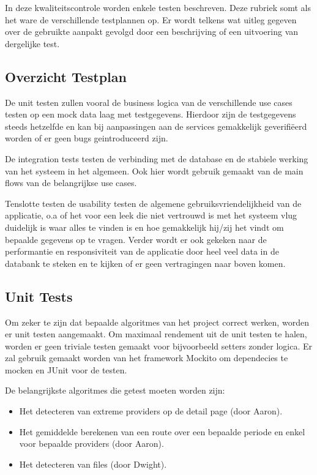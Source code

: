 In deze kwaliteitscontrole worden enkele testen beschreven. Deze rubriek somt als het ware de verschillende testplannen op. Er wordt telkens wat uitleg gegeven over de gebruikte aanpakt gevolgd door een beschrijving of een uitvoering van dergelijke test. 

\subsection{Overzicht Testplan}

De unit testen zullen vooral de business logica van de verschillende use cases testen op een mock data laag met testgegevens. Hierdoor zijn de testgegevens steeds hetzelfde en kan bij aanpassingen aan de services gemakkelijk geverifiëerd worden of er geen bugs geintroduceerd zijn.

De integration tests testen de verbinding met de database en de stabiele werking van het systeem in het algemeen. Ook hier wordt gebruik gemaakt van de main flows van de belangrijkse use cases.

Tenslotte testen de usability testen de algemene gebruiksvriendelijkheid van de applicatie, o.a of het voor een leek die niet vertrouwd is met het systeem vlug duidelijk is waar alles te vinden is en hoe gemakkelijk hij/zij het vindt om bepaalde gegevens op te vragen. Verder wordt er ook gekeken naar de performantie en responsiviteit van de applicatie door heel veel data in de databank te steken en te kijken of er geen vertragingen naar boven komen.

\subsection{Unit Tests}

Om zeker te zijn dat bepaalde algoritmes van het project correct werken, worden er unit testen aangemaakt. Om maximaal rendement uit de unit testen te halen, worden er geen triviale testen gemaakt voor bijvoorbeeld setters zonder logica. Er zal gebruik gemaakt worden van het framework Mockito om dependecies te mocken en JUnit voor de testen. 

De belangrijkste algoritmes die getest moeten worden zijn:

\begin{itemize}
\item Het detecteren van extreme providers op de detail page (door Aaron).
\item Het gemiddelde berekenen van een route over een bepaalde periode en enkel voor bepaalde providers (door Aaron).
\item Het detecteren van files (door Dwight).
\end{itemize}

